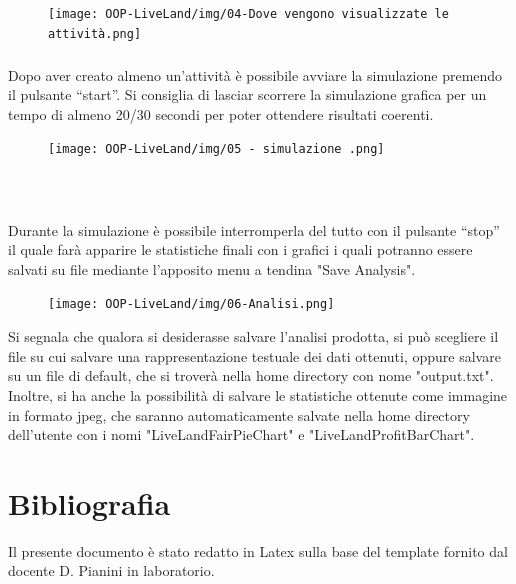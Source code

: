 \documentclass[a4paper,12pt]{report}
\begin{document}
\begin{figure}[h]
\centering{}
\texttt{[image: OOP-LiveLand/img/04-Dove vengono visualizzate le attività.png]}
\label{img:attività}
\end{figure}

\onecolumn
\paragraph{}Dopo aver creato almeno un’attività è possibile avviare la simulazione premendo il pulsante “start”. Si consiglia di lasciar scorrere la simulazione grafica per un tempo di almeno 20/30 secondi per poter ottendere risultati coerenti.

\begin{figure}[h]
\centering{}
\texttt{[image: OOP-LiveLand/img/05 - simulazione .png]}
\label{img:simulazione}
\end{figure}

\paragraph{\\}Durante la simulazione è possibile interromperla del tutto con il pulsante “stop” il quale farà apparire le statistiche finali con i grafici i quali potranno essere salvati su file mediante l'apposito menu a tendina "Save Analysis".

\begin{figure}[h]
\centering{}
\texttt{[image: OOP-LiveLand/img/06-Analisi.png]}
\label{img:analisi}
\end{figure}

Si segnala che qualora si desiderasse salvare l'analisi prodotta, si può scegliere il file su cui salvare una rappresentazione testuale dei dati ottenuti, oppure salvare su un file di default, che si troverà nella home directory con nome "output.txt". Inoltre, si ha anche la possibilità di salvare le statistiche ottenute come immagine in formato jpeg, che saranno automaticamente salvate nella home directory dell'utente con i nomi "LiveLandFairPieChart" e "LiveLandProfitBarChart".


\chapter{Bibliografia}


Il presente documento è stato redatto in Latex sulla base del template fornito dal docente D. Pianini in laboratorio.
\end{document}
